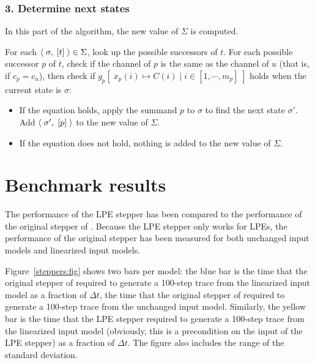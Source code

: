 \subsubsection{3. Determine next states}

In this part of the algorithm, the new value of $\Sigma$ is computed.

For each $\langle\;\sigma,\;[t]\;\rangle \in \Sigma$, look up the possible successors of $t$.
For each possible successor $p$ of $t$, check if the channel of $p$ is the same as the channel of $u$ (that is, if $c_{p} = c_{u}$), then check if $g_p[\; x_p(i) \mapsto C(i) \;|\; i \in [1,\cdots{},m_p] \;]$ holds when the current state is $\sigma$:
\begin{itemize}
\item If the equation holds, apply the summand $p$ to $\sigma$ to find the next state $\sigma'$.
Add $\langle\;\sigma',\;[p]\;\rangle$ to the new value of $\Sigma$.
\item If the equation does not hold, nothing is added to the new value of $\Sigma$.
\end{itemize}

\clearpage
\section{Benchmark results}

The performance of the LPE stepper has been compared to the performance of the original stepper of \txs{}.
Because the LPE stepper only works for LPEs, the performance of the original stepper has been measured for both unchanged input models and linearized input models.

Figure~\ref{steppers:fig} shows two bars per model: the blue bar is the time that the original stepper of \txs{} required to generate a 100-step trace from the linearized input model as a fraction of $\Delta t$, the time that the original stepper of \txs{} required to generate a 100-step trace from the unchanged input model.
Similarly, the yellow bar is the time that the LPE stepper required to generate a 100-step trace from the linearized input model (obviously, this is a precondition on the input of the LPE stepper) as a fraction of $\Delta t$.
The figure also includes the range of the standard deviation.

